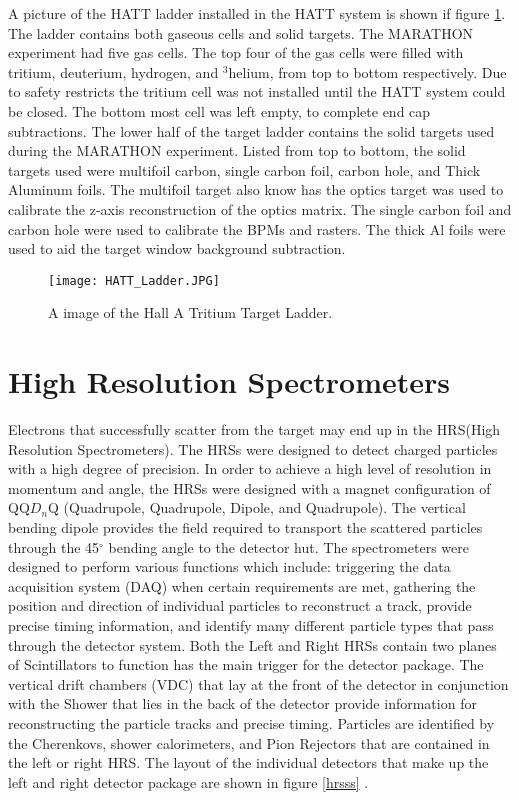 A picture of the HATT ladder installed in the HATT system is shown if figure \ref{HATT_L}. The ladder contains both gaseous cells and solid targets. The MARATHON experiment had five gas cells. The top four of the gas cells were filled with tritium, deuterium, hydrogen, and $^3$helium, from top to bottom respectively. Due to safety restricts the tritium cell was not installed until the HATT system could be closed. The bottom most cell was left empty, to complete end cap subtractions. The lower half of the target ladder contains the solid targets used during the MARATHON experiment. Listed from top to bottom, the solid targets used were multifoil carbon, single carbon foil, carbon hole, and Thick Aluminum foils. 
The multifoil target also know has the optics target was used to calibrate the z-axis reconstruction of the optics matrix. The single carbon foil and carbon hole were used to calibrate the BPMs and rasters. The thick Al foils were used to aid the target window background subtraction.

\begin{figure}
	\centering
	\texttt{[image: HATT\_Ladder.JPG]}
	\caption{A image of the Hall A Tritium Target Ladder. \cite{DHimages} }
	\label{HATT_L}
\end{figure}




\section{High Resolution Spectrometers}
Electrons that successfully scatter from the target may end up in the HRS(High Resolution Spectrometers). The HRSs were designed to detect charged particles with a high degree of precision. In order to achieve a high level of resolution in momentum and angle, the HRSs were designed with a magnet configuration of QQ$D_n$Q (Quadrupole, Quadrupole, Dipole, and Quadrupole). The vertical bending dipole provides the field required to transport the scattered particles through the 45$^\circ$ bending angle to the detector hut. The spectrometers were designed to perform various functions which include: triggering the data acquisition system (DAQ) when certain requirements are met, gathering the position and direction of individual particles to reconstruct a track, provide precise timing information, and identify many different particle types that pass through the detector system. Both the Left and Right HRSs contain two planes of Scintillators to function has the main trigger for the detector package. The vertical drift chambers (VDC) that lay at the front of the detector in conjunction with the Shower that lies in the back of the detector provide information for reconstructing the particle tracks and precise timing. Particles are identified by the Cherenkovs, shower calorimeters, and Pion Rejectors that are contained in the left or right HRS. The layout of the individual detectors that make up the left and right detector package are shown in figure \ref{hrsss}  \cite{HallA}.


